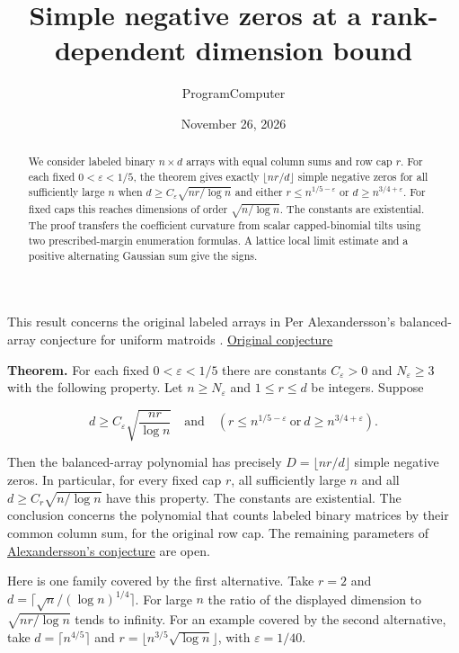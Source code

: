 \documentclass[11pt]{article}
\title{Simple negative zeros at a rank-dependent dimension bound}
\author{ProgramComputer}
\date{November 26, 2026}
\begin{document}
\maketitle

\begin{abstract}
We consider labeled binary $n\times d$ arrays with equal column
sums and row cap $r$. For each fixed $0<\varepsilon<1/5$, the
theorem gives exactly $\lfloor nr/d\rfloor$ simple negative
zeros for all sufficiently large $n$ when
$d\ge C_\varepsilon\sqrt{nr/\log n}$ and either
$r\le n^{1/5-\varepsilon}$ or $d\ge n^{3/4+\varepsilon}$.
For fixed caps this reaches dimensions of order
$\sqrt{n/\log n}$. The constants are existential.
The proof transfers the coefficient curvature from scalar
capped-binomial tilts using two prescribed-margin enumeration
formulas. A lattice local limit estimate and a positive
alternating Gaussian sum give the signs.
\end{abstract}

This result concerns the original labeled arrays in Per Alexandersson's balanced-array conjecture for uniform matroids \cite{Alex}. \href{https://www.symmetricfunctions.com/realRootedOpenProblems.htm\#conjBalancedArrays}{Original conjecture}

\textbf{Theorem.} For each fixed $0<\varepsilon<1/5$ there are constants $C_\varepsilon>0$ and $N_\varepsilon\ge3$ with the following property. Let $n\ge N_\varepsilon$ and $1\le r\le d$ be integers. Suppose

\[
d\ge C_\varepsilon\sqrt{\frac{nr}{\log n}}
\quad\text{and}\quad
\left(r\le n^{1/5-\varepsilon}\ \text{or}\ d\ge n^{3/4+\varepsilon}\right).
\]

Then the balanced-array polynomial has precisely $D=\lfloor nr/d\rfloor$ simple negative zeros. In particular, for every fixed cap $r$, all sufficiently large $n$ and all $d\ge C_r\sqrt{n/\log n}$ have this property. The constants are existential. The conclusion concerns the polynomial that counts labeled binary matrices by their common column sum, for the original row cap. The remaining parameters of \href{https://www.symmetricfunctions.com/realRootedOpenProblems.htm\#conjBalancedArrays}{Alexandersson's conjecture} are open.

Here is one family covered by the first alternative. Take $r=2$ and $d=\lceil\sqrt n/(\log n)^{1/4}\rceil$. For large $n$ the ratio of the displayed dimension to $\sqrt{nr/\log n}$ tends to infinity. For an example covered by the second alternative, take $d=\lceil n^{4/5}\rceil$ and $r=\lfloor n^{3/5}\sqrt{\log n}\rfloor$, with $\varepsilon=1/40$.
\end{document}
